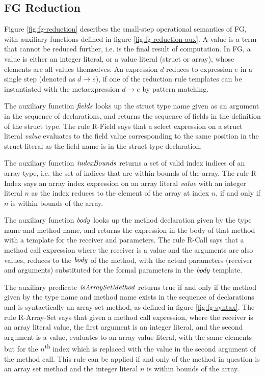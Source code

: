 

\subsection{FG Reduction}

Figure \ref{fig:fg-reduction} describes the small-step operational semantics of
FG, with auxiliary functions defined in figure \ref{fig:fg-reduction-aux}. A
value is a term that cannot be reduced further, i.e. is the final result of
computation. In FG, a value is either an integer literal, or a value literal
(struct or array), whose elements are all values themselves. An expression $d$
reduces to expression $e$ in a single step (denoted as $d \to e$), if one of the
reduction rule templates can be instantiated with the metaexpression $d \to e$
by pattern matching.

The auxiliary function $\mathit{fields}$ looks up the struct type name given as an
argument in the sequence of declarations, and returns the sequence of fields in
the definition of the struct type. The rule R-Field says that a select
expression on a struct literal \emph{value} evaluates to the field value
corresponding to the same position in the struct literal as the field name is in
the struct type declaration.

The auxiliary function $\mathit{indexBounds}$ returns a set of valid index indices of an
array type, i.e. the set of indices that are within bounds of the array. The
rule R-Index says an array index expression on an array literal \emph{value}
with an integer literal $n$ as the index reduces to the element of the array at
index $n$, if and only if $n$ is within bounds of the array.

The auxiliary function $\mathit{body}$ looks up the method declaration given by the
type name and method name, and returns the expression in the body of that method
with a template for the receiver and parameters. The rule R-Call says that a
method call expression where the receiver is a value and the arguments are also
values, reduces to the $\mathit{body}$ of the method, with the actual parameters
(receiver and arguments) substituted for the formal parameters in the $\mathit{body}$
template.

The auxiliary predicate $\mathit{isArraySetMethod}$ returns true if and only if the
method given by the type name and method name exists in the sequence of
declarations and is syntactically an array set method, as defined in figure
\ref{fig:fg-syntax}. The rule R-Array-Set says that given a method call
expression, where the receiver is an array literal value, the first argument is
an integer literal, and the second argument is a value, evaluates to an array
value literal, with the same elements but for the $n$\textsuperscript{th} index
which is replaced with the value in the second argument of the method call. This
rule can be applied if and only of the method in question is an array set method
and the integer literal $n$ is within bounds of the array.

